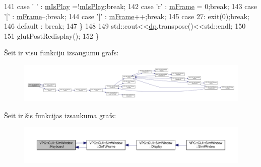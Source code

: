 \begin{DoxyCode}
141         \textcolor{keywordflow}{case} \textcolor{charliteral}{' '} : \hyperlink{class_v_p_c_1_1_g_u_i_1_1_sim_window_a8c6442f9906e2c458de626825dd477d7}{mIsPlay} =!\hyperlink{class_v_p_c_1_1_g_u_i_1_1_sim_window_a8c6442f9906e2c458de626825dd477d7}{mIsPlay};\textcolor{keywordflow}{break};
142         \textcolor{keywordflow}{case} \textcolor{charliteral}{'r'} : \hyperlink{class_v_p_c_1_1_g_u_i_1_1_sim_window_a639a2dd01463388074a24d18d6144832}{mFrame} = 0;\textcolor{keywordflow}{break};
143         \textcolor{keywordflow}{case} \textcolor{charliteral}{'['} : \hyperlink{class_v_p_c_1_1_g_u_i_1_1_sim_window_a639a2dd01463388074a24d18d6144832}{mFrame}--;\textcolor{keywordflow}{break};
144         \textcolor{keywordflow}{case} \textcolor{charliteral}{']'} : \hyperlink{class_v_p_c_1_1_g_u_i_1_1_sim_window_a639a2dd01463388074a24d18d6144832}{mFrame}++;\textcolor{keywordflow}{break};
145         \textcolor{keywordflow}{case} 27: exit(0);\textcolor{keywordflow}{break};
146         \textcolor{keywordflow}{default} : \textcolor{keywordflow}{break};
147     \}
148 
149     std::cout<<\hyperlink{class_v_p_c_1_1_g_u_i_1_1_sim_window_a144f2ee38a2a5e72b3b7d9d2505bd23e}{dp}.transpose()<<std::endl;
150 
151     glutPostRedisplay();
152 \}
\end{DoxyCode}


Šeit ir visu funkciju izsaugumu grafs\+:
\nopagebreak
\begin{figure}[H]
\begin{center}
\leavevmode
\includegraphics[width=350pt]{class_v_p_c_1_1_g_u_i_1_1_sim_window_a6da00ed4fb5f11befaf1dba6485cfcfb_cgraph}
\end{center}
\end{figure}




Šeit ir šīs funkcijas izsaukuma grafs\+:
\nopagebreak
\begin{figure}[H]
\begin{center}
\leavevmode
\includegraphics[width=350pt]{class_v_p_c_1_1_g_u_i_1_1_sim_window_a6da00ed4fb5f11befaf1dba6485cfcfb_icgraph}
\end{center}
\end{figure}


